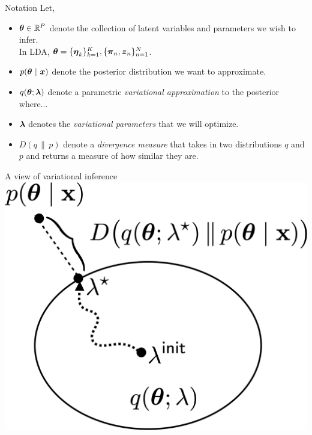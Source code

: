 \documentclass[aspectratio=169]{beamer}
\begin{document}
\begin{frame}{Notation}
Let,
\begin{itemize}
    \item $\boldsymbol{\theta} \in \mathbb{R}^P$ denote the collection of latent variables and parameters we wish to infer. \\
    In LDA, $\boldsymbol{\theta} = \{\boldsymbol{\eta}_k\}_{k=1}^K, \{\boldsymbol{\pi}_n, \boldsymbol{z}_n\}_{n=1}^N$.
    
    \item $p(\boldsymbol{\theta} ~\vert~ \boldsymbol{x})$ denote the posterior distribution we want to approximate.
    
    \item $q(\boldsymbol{\theta}; \boldsymbol{\lambda})$ denote a parametric \textit{variational approximation} to the posterior where...
    
    \item $\boldsymbol{\lambda}$ denotes the \textit{variational parameters} that we will optimize.
    
    \item $D(q \, \| \, p)$ denote a \textit{divergence measure} that takes in two distributions $q$ and $p$ and returns a measure of how similar they are.
\end{itemize}
\end{frame}

\begin{frame}{A view of variational inference}
\centering
    \includegraphics[width=.5\textwidth]{figures/lap5/vi.png}
\end{frame}
\end{document}
